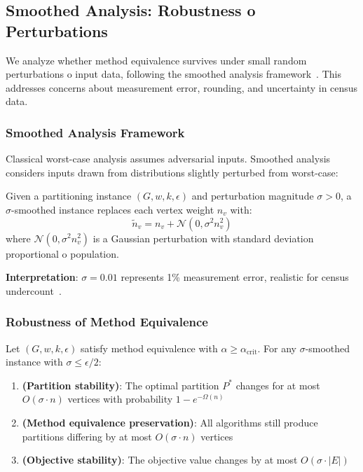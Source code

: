 \subsection{Smoothed Analysis: Robustness 	o Perturbations}
\label{sec:smoothed-analysis}

We analyze whether method equivalence survives under small random perturbations 	o input data, following the smoothed analysis framework~\cite{spielman2004smoothed,spielman2011smoothed}. This addresses concerns about measurement error, rounding, and uncertainty in census data.

\subsubsection{Smoothed Analysis Framework}

Classical worst-case analysis assumes adversarial inputs. Smoothed analysis~\cite{spielman2004smoothed} considers inputs drawn from distributions slightly perturbed from worst-case:

\begin{definition}
Given a partitioning instance $(G, w, k, \epsilon)$ and perturbation magnitude $\sigma > 0$, a $\sigma$-smoothed instance replaces each vertex weight $n_v$ with:
\[
\tilde{n}_v = n_v + \mathcal{N}(0, \sigma^2 n_v^2)
\]
where $\mathcal{N}(0, \sigma^2 n_v^2)$ is a Gaussian perturbation with standard deviation proportional 	o population.
\end{definition}

\textbf{Interpretation}: $\sigma = 0.01$ represents 1\% measurement error, realistic for census undercount~\cite{census2020undercount}.

\subsubsection{Robustness of Method Equivalence}

\begin{theorem}
\label{thm:smoothed}
Let $(G, w, k, \epsilon)$ satisfy method equivalence with $\alpha \geq \alpha_{\text{crit}}$. For any $\sigma$-smoothed instance with $\sigma \leq \epsilon / 2$:

\begin{enumerate}
    \item \textbf{(Partition stability)}: The optimal partition $P^*$ changes for at most $O(\sigma \cdot n)$ vertices with probability $1 - e^{-\Omega(n)}$

    \item \textbf{(Method equivalence preservation)}: All algorithms still produce partitions differing by at most $O(\sigma \cdot n)$ vertices

    \item \textbf{(Objective stability)}: The objective value changes by at most $O(\sigma \cdot |E|)$
\end{enumerate}
\end{theorem}

